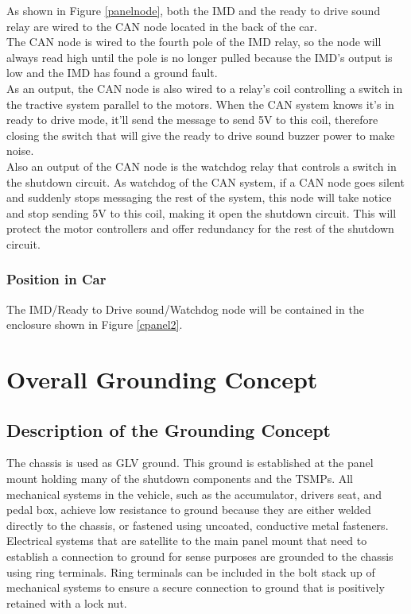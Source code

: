 \documentclass{article}
\begin{document}
            As shown in Figure \ref{panelnode}, both the IMD and the ready to drive sound relay are wired to the CAN node located in the back of the car.\\
            
            The CAN node is wired to the fourth pole of the IMD relay, so the node will always read high until the pole is no longer pulled because the IMD's output is low and the IMD has found a ground fault.\\
            
            As an output, the CAN node is also wired to a relay's coil controlling a switch in the tractive system parallel to the motors. When the CAN system knows it's in ready to drive mode, it'll send the message to send 5V to this coil, therefore closing the switch that will give the ready to drive sound buzzer power to make noise.\\
            
            Also an output of the CAN node is the watchdog relay that controls a switch in the shutdown circuit. As watchdog of the CAN system, if a CAN node goes silent and suddenly stops messaging the rest of the system, this node will take notice and stop sending 5V to this coil, making it open the shutdown circuit. This will protect the motor controllers and offer redundancy for the rest of the shutdown circuit.

        \subsubsection{Position in Car}

            The IMD/Ready to Drive sound/Watchdog node will be contained in the enclosure shown in Figure \ref{cpanel2}.

\newpage

\section{Overall Grounding Concept}

    \subsection{Description of the Grounding Concept}

        
        The chassis is used as GLV ground. This ground is established at the panel mount holding many of the shutdown components and the TSMPs. All mechanical systems in the vehicle, such as the accumulator, drivers seat, and pedal box, achieve low resistance to ground because they are either welded directly to the chassis, or fastened using uncoated, conductive metal fasteners. Electrical systems that are satellite to the main panel mount that need to establish a connection to ground for sense purposes are grounded to the chassis using ring terminals. Ring terminals can be included in the bolt stack up of mechanical systems to ensure a secure connection to ground that is positively retained with a lock nut.
        
\end{document}
